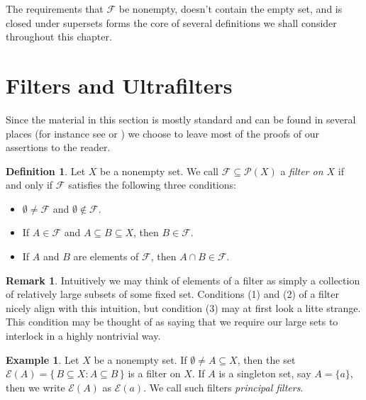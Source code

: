 \documentclass[12pt]{article}
\theoremstyle{plain}
\theoremstyle{definition}
\newtheorem{defn}[thm]{Definition}
\newtheorem{rmk}[thm]{Remark}
\newtheorem{example}[thm]{Example}
\newcommand{\calE}{\mathcal{E}}
\newcommand{\calF}{\mathcal{F}}
\newcommand{\calP}{\mathcal{P}}
\begin{document}
The requirements that $\calF$ be nonempty, doesn't contain the empty set, and is closed under supersets forms the core of several definitions we shall consider throughout this chapter. 

\section{Filters and Ultrafilters}
Since the material in this section is mostly standard and can be found in several places (for instance see \cite[Chapter 5]{Schechter:1997fk} or \cite[Chapter 3]{Hindman:1998fk}) we choose to leave most of the proofs of our assertions to the reader.
\begin{defn}
  \label{defn:filters}
  Let $X$ be a nonempty set.
  We call $\calF \subseteq \calP(X)$ a \textsl{filter on $X$} if and only if $\calF$ satisfies the following three conditions:
  \begin{itemize}
    \item[(1)] $\emptyset \ne \calF$ and $\emptyset \not\in\calF$.
    \item[(2)] If $A \in \calF$ and $A \subseteq B \subseteq X$, then $B \in \calF$.
    \item[(3)] If $A$ and $B$ are elements of $\calF$, then $A \cap B \in \calF$.
  \end{itemize}
\end{defn}
\begin{rmk}
  Intuitively we may think of elements of a filter as simply a collection of relatively large subsets of some fixed set.
  Conditions (1) and (2) of a filter nicely align with this intuition, but condition (3) may at first look a litte strange.
  This condition may be thought of as saying that we require our large sets to interlock in a highly nontrivial way.%
\end{rmk}

\begin{example}
  \label{ex:prinFilt}
  Let $X$ be a nonempty set.
  If $\emptyset \ne A \subseteq X$, then the set $\calE(A) = \{\, B \subseteq X : A \subseteq B \,\}$ is a filter on $X$.
  If $A$ is a singleton set, say $A = \{a\}$, then we write $\calE(A)$ as $\calE(a)$. 
  We call such filters \textsl{principal filters}.
\end{example}
\end{document}
